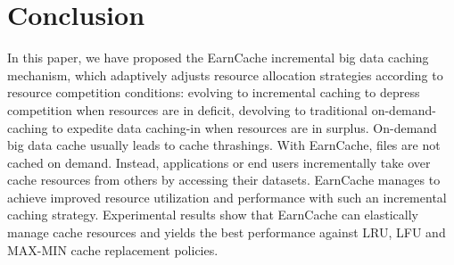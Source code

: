 \documentclass[letterpaper,twocolumn,10pt]{article}
\begin{document}


%







\section{Conclusion}\label{sec:Conclusion}

In this paper, we have proposed the EarnCache incremental big data caching mechanism, which adaptively adjusts resource allocation strategies according to resource competition conditions: evolving to incremental caching to depress competition when resources are in deficit, devolving to traditional on-demand-caching to expedite data caching-in when resources are in surplus.
On-demand big data cache usually leads to cache thrashings.
With EarnCache, files are not cached on demand. Instead, applications or end users incrementally take over cache resources from others by accessing their datasets.
EarnCache manages to achieve improved resource utilization and performance with such an incremental caching strategy.
Experimental results show that EarnCache can elastically manage cache resources and yields the best performance against LRU, LFU and MAX-MIN cache replacement policies.



%
%
\end{document}
